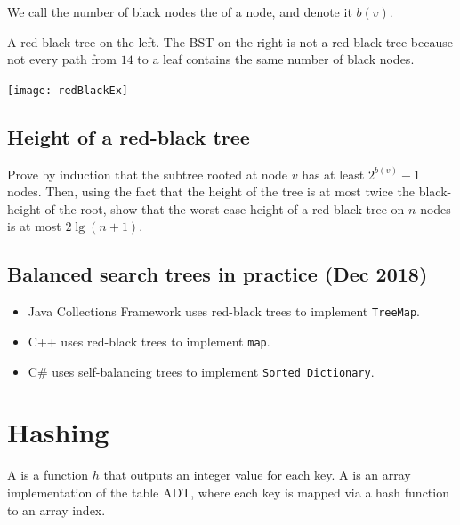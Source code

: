 We call the number of black nodes the  of a node, and denote it $b(v)$.

\begin{Boxample} \label{ex:redblackTreeEx}
A red-black tree on the left. The BST on the right is not a red-black tree 
  because not every path from $14$ to a leaf contains the same number of black nodes.
\begin{center}
  \texttt{[image: redBlackEx]}
\end{center}
\end{Boxample}

\section{Height of a red-black tree}

\begin{Boxample}[5]
Prove by induction that the subtree rooted at node $v$ has at least $2^{b(v)} - 1$ nodes.
Then, using the fact that the height of the tree is at most twice the black-height of the root,  show that the worst case height of a red-black tree on $n$ nodes 
is at most $2 \lg (n+1)$.
\end{Boxample}

\section{Balanced search trees in practice (Dec 2018)}
\begin{itemize}
\item Java Collections Framework uses red-black trees to implement \texttt{TreeMap}.
\item C++ uses red-black trees to implement \texttt{map}.
\item C\# uses self-balancing trees to implement \texttt{Sorted Dictionary}.
\end{itemize}





\chapter{Hashing} %
\begin{Definition}
A  is a function $h$ that outputs an integer value for each key. 
A  is an array implementation of the table ADT, 
where each key is mapped via a hash function to an array index. 
\end{Definition}

